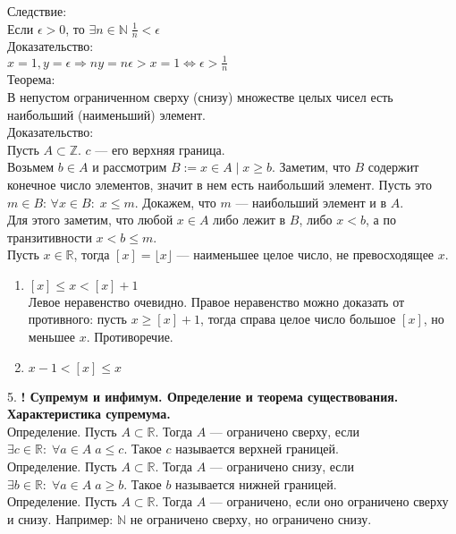 \documentclass[12pt]{article}
\begin{document}
Следствие:\\
Если $\epsilon > 0$, то $\exists n \in \mathbb{N} \; \frac{1}{n} < \epsilon$\\
Доказательство:\\
$x = 1, y = \epsilon \Rightarrow ny = n \epsilon > x = 1 \iff \epsilon > \frac{1}{n}$\\

Теорема:\\
В непустом ограниченном сверху (снизу) множестве целых чисел есть наибольший (наименьший) элемент.\\
Доказательство:\\
Пусть $A \subset \mathbb{Z}$.  $c$ --- его верхняя граница.\\
Возьмем  $b \in A$ и рассмотрим  $B := {x \in A \mid x \ge b}$. Заметим, что $B$ содержит конечное число элементов, значит в нем есть наибольший элемент. Пусть это $m \in B$:  $\forall x \in B:\; x \le m$. Докажем, что $m$ --- наибольший элемент и в  $A$.\\
Для этого заметим, что любой $x \in A$ либо лежит в $B$, либо  $x < b$, а по транзитивности  $x < b \le m$.\\

Пусть $x \in \mathbb{R}$, тогда  $[x] = \lfloor x \rfloor$ --- наименьшее целое число, не превосходящее  $x$.
\begin{enumerate}
    \item $[x]  \le x < [x] + 1$\\
        Левое неравенство очевидно. Правое неравенство можно доказать от противного: пусть $x \ge [x] + 1$, тогда справа целое число большое $[x]$, но меньшее  $x$. Противоречие.
    \item $x - 1 < [x] \le x$
\end{enumerate}

5. \textbf{! Супремум и инфимум. Определение и теорема существования. Характеристика супремума.}\\
Определение. Пусть $A \subset \mathbb{R}$. Тогда  $A$ --- ограничено сверху, если  $\exists c \in \mathbb{R}: \; \forall a \in A\; a \le c$. Такое $c$ называется верхней границей.\\

Определение. Пусть $A \subset \mathbb{R}$. Тогда  $A$ --- ограничено снизу, если  $\exists b \in \mathbb{R}: \; \forall a \in A\; a \ge b$. Такое  $b$ называется нижней границей.\\

Определение. Пусть $A \subset \mathbb{R}$. Тогда  $A$ --- ограничено, если оно ограничено сверху и снизу. Например: $\mathbb{N}$ не ограничено сверху, но ограничено снизу.\\
\end{document}
